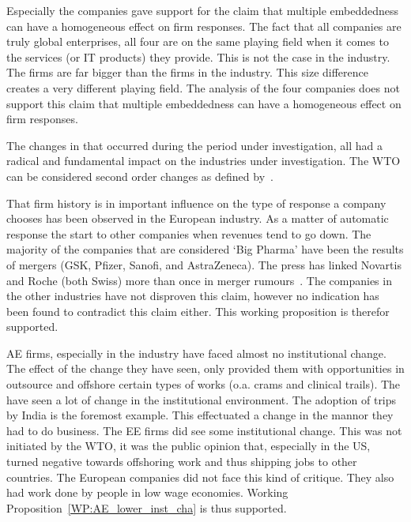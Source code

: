 Especially the \its companies gave support for the claim that multiple embeddedness can have a homogeneous effect on firm responses.
The fact that all companies are truly global enterprises, all four are on the same playing field when it comes to the services (or IT products) they provide. 
This is not the case in the \pharma industry.
The  firms are far bigger than the  firms in the \pharma industry.
This size difference creates a very different playing field.
The analysis of the four \pharma companies does not support this claim that multiple embeddedness can have a homogeneous effect on firm responses.

The changes in \rr that occurred during the period under investigation, all had a radical and fundamental impact on the industries under investigation.
The WTO \rr can be considered second order changes as defined by~\cite{Meyer:1995td}.

That firm history is in important influence on the type of response a company chooses has been observed in the European \pharma industry.
As a matter of automatic response the \pharma start to \acq other companies when revenues tend to go down.
The majority of the companies that are considered `Big Pharma' have been the results of mergers (GSK, Pfizer, Sanofi, and AstraZeneca).
The press has linked Novartis and Roche (both Swiss) more than once in merger rumours~\citep{The-New-York-Times:2011}.
The companies in the other industries have not disproven this claim, however no indication has been found to contradict this claim either. 
This working proposition is therefor supported.

\Glsdesc{AE} firms, especially in the \pharma industry have faced almost no institutional change.
The effect of the change they have seen, only provided them with opportunities in outsource and offshore certain types of works (o.a. \gls{crams} and clinical trails).
The  have seen a lot of change in the institutional environment.
The adoption of \gls{trips} by India is the foremost example.
This effectuated a change in the mannor they had to do business.
The \gls{EE} \its firms did see some institutional change.
This was not initiated by the WTO, it was the public opinion that, especially in the US, turned negative towards offshoring work and thus shipping jobs to other countries.
The European \its companies did not face this kind of critique.
They also had work done by people in low wage economies.
Working Proposition~\ref{WP:AE_lower_inst_cha} is thus supported.


